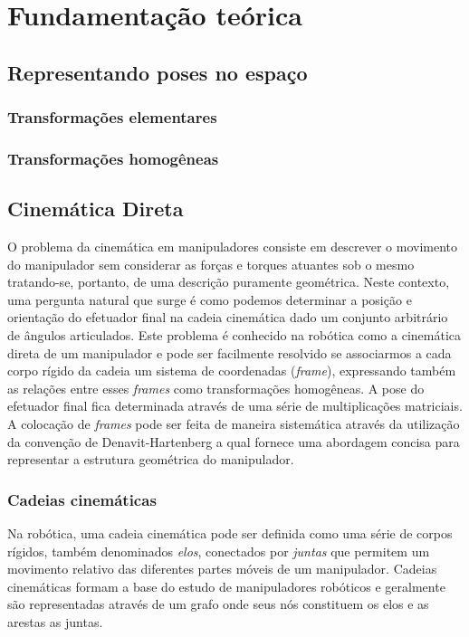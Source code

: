 \chapter{Fundamentação teórica}\label{cap:background}

\section{Representando poses no espaço}

\subsection{Transformações elementares}

\subsection{Transformações homogêneas}

\section{Cinemática Direta}

O problema da cinemática em manipuladores consiste em descrever o movimento do
manipulador sem considerar as forças e torques atuantes sob o mesmo
tratando-se, portanto, de uma descrição puramente geométrica. Neste contexto,
uma pergunta natural que surge é como podemos determinar a posição e orientação
do efetuador final na cadeia cinemática dado um conjunto arbitrário de ângulos
articulados. Este problema é conhecido na robótica como a cinemática direta de
um manipulador e pode ser facilmente resolvido se associarmos a cada corpo
rígido da cadeia um sistema de coordenadas (\emph{frame}), expressando também
as relações entre esses \emph{frames} como transformações homogêneas. A pose do
efetuador final fica determinada através de uma série de multiplicações
matriciais. A colocação de \emph{frames} pode ser feita de maneira sistemática
através da utilização da convenção de Denavit-Hartenberg a qual fornece uma
abordagem concisa para representar a estrutura geométrica do manipulador.

\subsection{Cadeias cinemáticas}

Na robótica, uma cadeia cinemática pode ser definida como uma série de corpos
rígidos, também denominados \emph{elos}, conectados por \emph{juntas} que
permitem um movimento relativo das diferentes partes móveis de um manipulador.
Cadeias cinemáticas formam a base do estudo de manipuladores robóticos e
geralmente são representadas através de um grafo onde seus nós constituem os
elos e as arestas as juntas.


